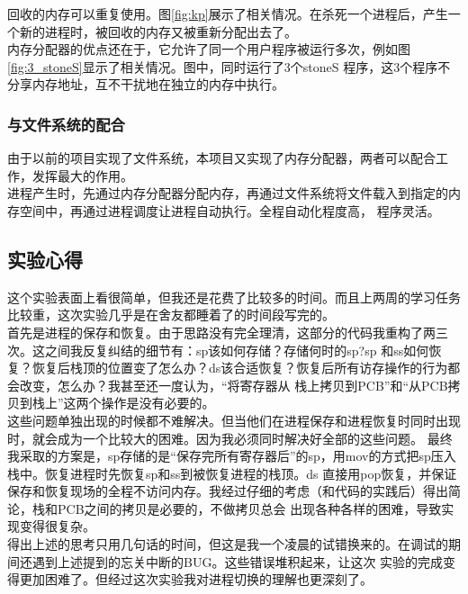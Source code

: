 \documentclass[a4paper]{article}
\begin{document}
    回收的内存可以重复使用。图\ref{fig:kp}展示了相关情况。在杀死一个进程后，产生一个新的进程时，被回收的内存又被重新分配出去了。\\ 

    内存分配器的优点还在于，它允许了同一个用户程序被运行多次，例如图\ref{fig:3_stoneS}显示了相关情况。图中，同时运行了3个stoneS
    程序，这3个程序不分享内存地址，互不干扰地在独立的内存中执行。
    \subsubsection{与文件系统的配合}
    由于以前的项目实现了文件系统，本项目又实现了内存分配器，两者可以配合工作，发挥最大的作用。\\ 

    进程产生时，先通过内存分配器分配内存，再通过文件系统将文件载入到指定的内存空间中，再通过进程调度让进程自动执行。全程自动化程度高，
    程序灵活。

    \subsection{实验心得}
    这个实验表面上看很简单，但我还是花费了比较多的时间。而且上两周的学习任务比较重，这次实验几乎是在舍友都睡着了的时间段写完的。\\ 

    首先是进程的保存和恢复。由于思路没有完全理清，这部分的代码我重构了两三次。这之间我反复纠结的细节有：sp该如何存储？存储何时的sp?sp
    和ss如何恢复？恢复后栈顶的位置变了怎么办？ds该合适恢复？恢复后所有访存操作的行为都会改变，怎么办？我甚至还一度认为，``将寄存器从
    栈上拷贝到PCB''和``从PCB拷贝到栈上''这两个操作是没有必要的。 \\ 

    这些问题单独出现的时候都不难解决。但当他们在进程保存和进程恢复时同时出现时，就会成为一个比较大的困难。因为我必须同时解决好全部的这些问题。
    最终我采取的方案是，sp存储的是``保存完所有寄存器后''的sp，用mov的方式把sp压入栈中。恢复进程时先恢复sp和ss到被恢复进程的栈顶。ds
    直接用pop恢复，并保证保存和恢复现场的全程不访问内存。我经过仔细的考虑（和代码的实践后）得出简论，栈和PCB之间的拷贝是必要的，不做拷贝总会
    出现各种各样的困难，导致实现变得很复杂。\\ 

    得出上述的思考只用几句话的时间，但这是我一个凌晨的试错换来的。在调试的期间还遇到上述提到的忘关中断的BUG。这些错误堆积起来，让这次
    实验的完成变得更加困难了。但经过这次实验我对进程切换的理解也更深刻了。\\ 
\end{document}
